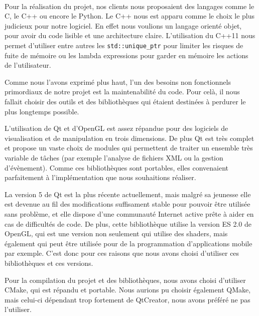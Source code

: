 \paragraph{}
        Pour la réalisation du projet, nos clients nous proposaient des langages comme le C, le C++ ou encore le Python. Le C++ nous est apparu comme le choix le plus judicieux pour notre logiciel. En effet nous voulions un langage orienté objet, pour avoir du code lisible et une architecture claire. L'utilisation du C++11 nous permet d'utiliser entre autres les \texttt{std::unique\_ptr} pour limiter les risques de fuite de mémoire ou les lambda expressions pour garder en mémoire les actions de l'utilisateur.

    Comme nous l'avons exprimé plus haut, l'un des besoins non fonctionnels primordiaux de notre projet est la maintenabilité du code. Pour celà, il nous fallait choisir des outils et des bibliothèques qui étaient destinées à perdurer le plus longtemps possible.
    
    L'utilisation de Qt et d'OpenGL est assez répandue pour des logiciels de visualisation et de manipulation en trois dimensions. De plus Qt est très complet et propose un vaste choix de modules qui permettent de traiter un ensemble très variable de tâches (par exemple l'analyse de fichiers XML ou la gestion d'évènement). Comme ces bibliothèques sont portables, elles convenaient parfaitement à l'implémentation que nous souhaitions réaliser.
    
    La version 5 de Qt est la plus récente actuellement, mais malgré sa jeunesse elle est devenue au fil des modifications suffisament stable pour pouvoir être utilisée sans problème, et elle dispose d'une communauté Internet active prête à aider en cas de difficultés de code. De plus, cette bibliothèque utilise la version ES 2.0 de OpenGL, qui est une version non seulement qui utilise des shaders, mais également qui peut être utilisée pour de la programmation d'applications mobile par exemple. C'est donc pour ces raisons que nous avons choisi d'utiliser ces bibliothèques et ces versions.

    Pour la compilation du projet et des bibliothèques, nous avons choisi d'utiliser CMake, qui est répandu et portable. Nous aurions pu choisir également QMake, mais celui-ci dépendant trop fortement de QtCreator, nous avons préféré ne pas l'utiliser.

